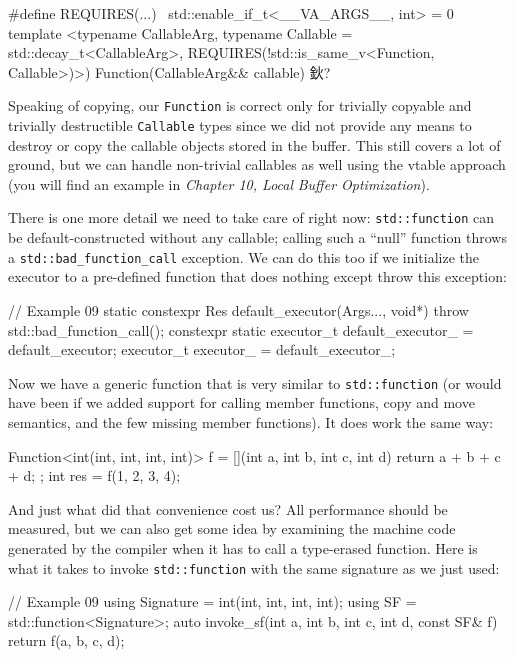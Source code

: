 {\begin{code}
#define REQUIRES(...) \
  std::enable_if_t<__VA_ARGS__, int> = 0
template <typename CallableArg,
          typename Callable = std::decay_t<CallableArg>,
          REQUIRES(!std::is_same_v<Function, Callable>)>)
Function(CallableArg&& callable) 鈥?
\end{code}

Speaking of copying, our \texttt{Function} is correct only for trivially copyable and trivially destructible \texttt{Callable} types since we did not provide any means to destroy or copy the callable objects stored in the buffer. This still covers a lot of ground, but we can handle non-trivial callables as well using the vtable approach (you will find an example in \emph{Chapter 10, Local} \emph{Buffer Optimization}).

There is one more detail we need to take care of right now: \texttt{std::function} can be default-constructed without any callable; calling such a ``null'' function throws a \texttt{std::bad\_function\_call} exception. We can do this too if we initialize the executor to a pre-defined function that does nothing except throw this exception:

\begin{code}
// Example 09
static constexpr Res default_executor(Args..., void*) {
  throw std::bad_function_call();
}
constexpr static executor_t default_executor_ =
  default_executor;
executor_t executor_ = default_executor_;
\end{code}

Now we have a generic function that is very similar to \texttt{std::function} (or would have been if we added support for calling member functions, copy and move semantics, and the few missing member functions). It does work the same way:

\begin{code}
Function<int(int, int, int, int)> f =
  [](int a, int b, int c, int d) { return a + b + c + d; };
int res = f(1, 2, 3, 4);
\end{code}

And just what did that convenience cost us? All performance should be measured, but we can also get some idea by examining the machine code generated by the compiler when it has to call a type-erased function. Here is what it takes to invoke \texttt{std::function} with the same signature as we just used:

\begin{code}
// Example 09
using Signature = int(int, int, int, int);
using SF = std::function<Signature>;
auto invoke_sf(int a, int b, int c, int d, const SF& f) {
  return f(a, b, c, d);
}
\end{code}

}
